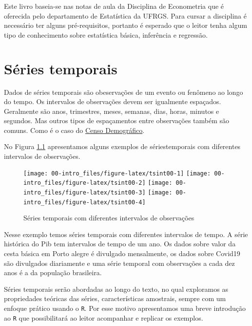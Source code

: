 \documentclass[
]{book}
\theoremstyle{definition}
\theoremstyle{definition}
\theoremstyle{definition}
\theoremstyle{remark}
\begin{document}
Este livro baseia-se nas notas de aula da Disciplina de Econometria que é oferecida pelo departamento de Estatística da UFRGS. Para cursar a disciplina é necessário ter alguns pré-requisitos, portanto é esperado que o leitor tenha algum tipo de conhecimento sobre estatística básica, inferência e regressão.

\hypertarget{suxe9ries-temporais}{%
\chapter{Séries temporais}\label{suxe9ries-temporais}}

Dados de séries temporais são obeservações de um evento ou fenômeno ao longo do tempo. Os intervalos de observações devem ser igualmente espaçados. Geralmente são anos, trimestres, meses, semanas, dias, horas, minutos e segundos. Mas outros tipos de espaçamentos entre observações também são comuns. Como é o caso do \href{https://www.ibge.gov.br/estatisticas/sociais/populacao/22827-censo-2020-censo4.html}{Censo Demográfico}.

No Figura \ref{fig:tsint00} apresentamos alguns exemplos de sériestemporais com diferentes intervalos de observações.

\begin{figure}

{\centering \texttt{[image: 00-intro\_files/figure-latex/tsint00-1]} \texttt{[image: 00-intro\_files/figure-latex/tsint00-2]} \texttt{[image: 00-intro\_files/figure-latex/tsint00-3]} \texttt{[image: 00-intro\_files/figure-latex/tsint00-4]} 

}

\caption{Séries temporais com diferentes intervalos de observações}\label{fig:tsint00}
\end{figure}

Nesse exemplo temos séries temporais com diferentes intervalos de tempo. A série histórica do Pib tem intervalos de tempo de um ano. Os dados sobre valor da cesta básica em Porto alegre é divulgado mensalmente, os dados sobre Covid19 são divulgados diariamente e uma série temporal com observações a cada dez anos é a da população brasileira.

Séries temporais serão abordadas ao longo do texto, no qual exploramos as propriedades teóricas das séries, características amostrais, sempre com um enfoque prático usando o \texttt{R}. Por esse motivo apresentamos uma breve introdução ao \texttt{R} que possibilitará ao leitor acompanhar e replicar os exemplos.
\end{document}
